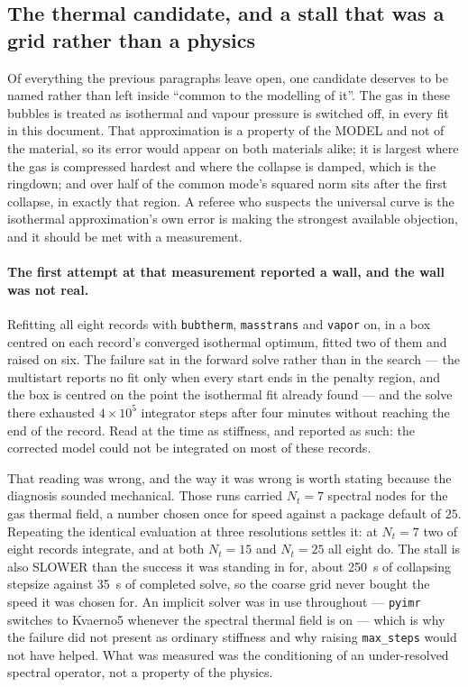 \documentclass[10pt]{article}
\begin{document}
\subsection{The thermal candidate, and a stall that was a grid rather than a physics}
\label{sec:vapour}

Of everything the previous paragraphs leave open, one candidate deserves to be named rather than
left inside ``common to the modelling of it''. The gas in these bubbles is treated as isothermal
and vapour pressure is switched off, in every fit in this document. That approximation is a
property of the MODEL and not of the material, so its error would appear on both materials
alike; it is largest where the gas is compressed hardest and where the collapse is damped, which
is the ringdown; and over half of the common mode's squared norm sits after the first collapse,
in exactly that region. A referee who suspects the universal curve is the isothermal
approximation's own error is making the strongest available objection, and it should be met with
a measurement.

\paragraph{The first attempt at that measurement reported a wall, and the wall was not real.}
Refitting all eight records with \texttt{bubtherm}, \texttt{masstrans} and \texttt{vapor} on, in
a box centred on each record's converged isothermal optimum, fitted two of them and raised on
six. The failure sat in the forward solve rather than in the search --- the multistart reports
no fit only when every start ends in the penalty region, and the box is centred on the point the
isothermal fit already found --- and the solve there exhausted $4\times10^{5}$ integrator steps
after four minutes without reaching the end of the record. Read at the time as stiffness, and
reported as such: the corrected model could not be integrated on most of these records.

That reading was wrong, and the way it was wrong is worth stating because the diagnosis sounded
mechanical. Those runs carried $N_t = 7$ spectral nodes for the gas thermal field, a number
chosen once for speed against a package default of $25$. Repeating the identical evaluation at
three resolutions settles it: at $N_t = 7$ two of eight records integrate, and at both $N_t = 15$
and $N_t = 25$ all eight do. The stall is also SLOWER than the success it was standing in for,
about \SI{250}{\second} of collapsing stepsize against \SI{35}{\second} of completed solve, so
the coarse grid never bought the speed it was chosen for. An implicit solver was in use
throughout --- \texttt{pyimr} switches to Kvaerno5 whenever the spectral thermal field is on ---
which is why the failure did not present as ordinary stiffness and why raising \texttt{max\_steps}
would not have helped. What was measured was the conditioning of an under-resolved spectral
operator, not a property of the physics.
\end{document}
